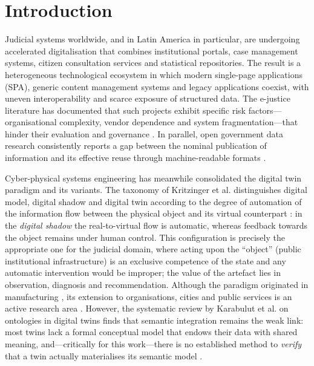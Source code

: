 \documentclass[engproc,article,submit,moreauthors]{Definitions/mdpi}
\begin{document}
\section{Introduction}
\label{sec:intro}

Judicial systems worldwide, and in Latin America in particular, are undergoing accelerated digitalisation that combines institutional portals, case management systems, citizen consultation services and statistical repositories. The result is a heterogeneous technological ecosystem in which modern single-page applications (SPA), generic content management systems and legacy applications coexist, with uneven interoperability and scarce exposure of structured data. The e-justice literature has documented that such projects exhibit specific risk factors---organisational complexity, vendor dependence and system fragmentation---that hinder their evaluation and governance \cite{Rosa2013}. In parallel, open government data research consistently reports a gap between the nominal publication of information and its effective reuse through machine-readable formats \cite{Janssen2012,Attard2015}.

Cyber-physical systems engineering has meanwhile consolidated the digital twin paradigm and its variants. The taxonomy of Kritzinger et al. distinguishes digital model, digital shadow and digital twin according to the degree of automation of the information flow between the physical object and its virtual counterpart \cite{Kritzinger2018}: in the \emph{digital shadow} the real-to-virtual flow is automatic, whereas feedback towards the object remains under human control. This configuration is precisely the appropriate one for the judicial domain, where acting upon the ``object'' (public institutional infrastructure) is an exclusive competence of the state and any automatic intervention would be improper; the value of the artefact lies in observation, diagnosis and recommendation. Although the paradigm originated in manufacturing \cite{Tao2019,Jones2020,Fuller2020,Semeraro2021}, its extension to organisations, cities and public services is an active research area \cite{Shahat2021,BotinSanabria2022,Brauner2022}. However, the systematic review by Karabulut et al. on ontologies in digital twins finds that semantic integration remains the weak link: most twins lack a formal conceptual model that endows their data with shared meaning, and---critically for this work---there is no established method to \emph{verify} that a twin actually materialises its semantic model \cite{Karabulut2024}.
\end{document}
